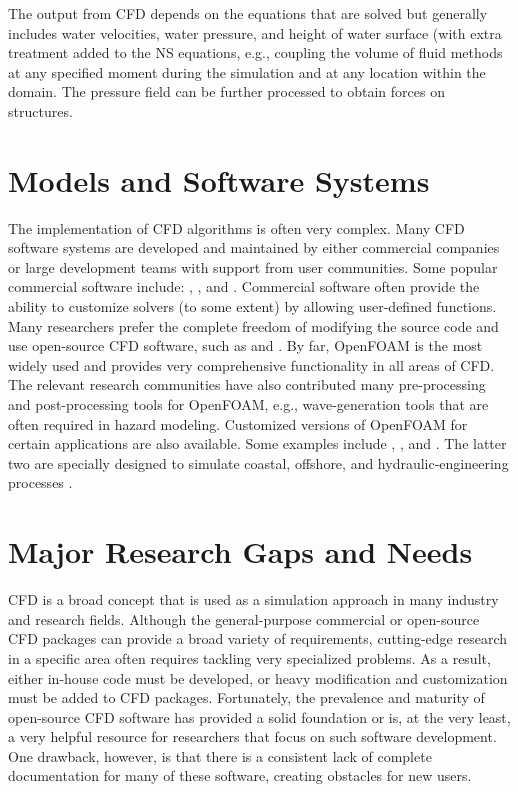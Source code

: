 The output from CFD depends on the equations that are solved but generally includes water velocities, water pressure, and height of water surface (with extra treatment added to the NS equations, e.g., coupling the volume of fluid methods \citep{Brackbill1992VOF, Hirt1981VOF, Jasak1996VOF, Ubbink1997VOF, Ubbink2002VOF} at any specified moment during the simulation and at any location within the domain. The pressure field can be further processed to obtain forces on structures.

\section{Models and Software Systems}
\label{sec:resp_cfd_water_methods}

The implementation of CFD algorithms is often very complex. Many CFD software systems are developed and maintained by either commercial companies or large development teams with support from user communities. Some popular commercial software include: , , and . Commercial software often provide the ability to customize solvers (to some extent) by allowing user-defined functions. Many researchers prefer the complete freedom of modifying the source code and use open-source CFD software, such as  and . By far, OpenFOAM is the most widely used and provides very comprehensive functionality in all areas of CFD. The relevant research communities have also contributed many pre-processing and post-processing tools for OpenFOAM, e.g., wave-generation tools that are often required in hazard modeling. Customized versions of OpenFOAM for certain applications are also available. Some examples include , , and . The latter two are specially designed to simulate coastal, offshore, and hydraulic-engineering processes \citep{Higuera2013OlaFlow, Higuera2013bOlaFlow, Higuera2014OlaFlow, Higuera2014bOlaFlow, Higuera2015OlaFlow}.

\section{Major Research Gaps and Needs}
\label{sec:resp_cfd_water_gaps}

CFD is a broad concept that is used as a simulation approach in many industry and research fields. Although the general-purpose commercial or open-source CFD packages can provide a broad variety of requirements, cutting-edge research in a specific area often requires tackling very specialized problems. As a result, either in-house code must be developed, or heavy modification and customization must be added to CFD packages. Fortunately, the prevalence and maturity of open-source CFD software has provided a solid foundation or is, at the very least, a very helpful resource for researchers that focus on such software development.  One drawback, however, is that there is a consistent lack of complete documentation for many of these software, creating obstacles for new users.

